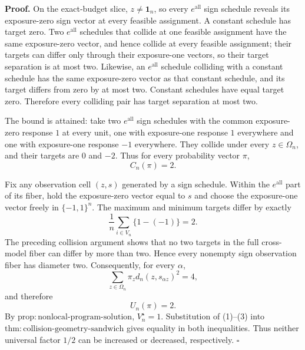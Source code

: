 \textbf{Proof.}
On the exact-budget slice, \(z\ne\mathbf 1_n\), so every \(e^{\mathrm{all}}\) sign schedule reveals its exposure-zero sign vector at every feasible assignment.  A constant schedule has target zero.  Two \(e^{\mathrm{all}}\) schedules that collide at one feasible assignment have the same exposure-zero vector, and hence collide at every feasible assignment; their targets can differ only through their exposure-one vectors, so their target separation is at most two.  Likewise, an \(e^{\mathrm{all}}\) schedule colliding with a constant schedule has the same exposure-zero vector as that constant schedule, and its target differs from zero by at most two.  Constant schedules have equal target zero.  Therefore every colliding pair has target separation at most two.

The bound is attained: take two \(e^{\mathrm{all}}\) sign schedules with the common exposure-zero response \(1\) at every unit, one with exposure-one response \(1\) everywhere and one with exposure-one response \(-1\) everywhere.  They collide under every \(z\in\Omega_n\), and their targets are \(0\) and \(-2\).  Thus for every probability vector \(\pi\),
\[
 C_n(\pi)=2. \tag{1}
\]

Fix any observation cell \((z,s)\) generated by a sign schedule.  Within the \(e^{\mathrm{all}}\) part of its fiber, hold the exposure-zero vector equal to \(s\) and choose the exposure-one vector freely in \(\{-1,1\}^n\).  The maximum and minimum targets differ by exactly
\[
 \frac1n\sum_{i\in V_n}\{1-(-1)\}=2. \tag{2}
\]
The preceding collision argument shows that no two targets in the full cross-model fiber can differ by more than two.  Hence every nonempty sign observation fiber has diameter two.  Consequently, for every \(\alpha\),
\[
 \sum_{z\in\Omega_n}\pi_zd_n(z,s_{\alpha z})^2=4,
\]
and therefore
\[
 U_n(\pi)=2. \tag{3}
\]
By \(\mathrm{prop{:}nonlocal\text{-}program\text{-}solution}\), \(V_n^\star=1\).  Substitution of (1)--(3) into \(\mathrm{thm{:}collision\text{-}geometry\text{-}sandwich}\) gives equality in both inequalities.  Thus neither universal factor \(1/2\) can be increased or decreased, respectively. \(\square\)
